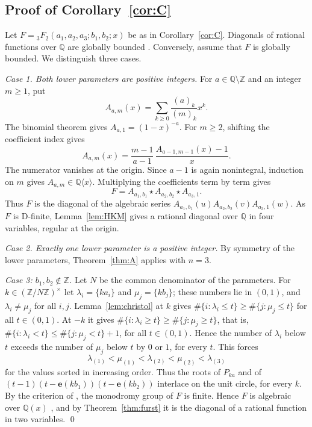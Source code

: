 \documentclass[11pt]{amsart}
\theoremstyle{definition}
\theoremstyle{remark}
\numberwithin{equation}{section}
\newcommand{\Q}{\mathbb{Q}}
\newcommand{\Z}{\mathbb{Z}}
\newcommand{\e}{\mathbf{e}}
\newcommand{\alg}[2]{#1\langle #2\rangle}
\begin{document}
\subsection{Proof of Corollary~\ref{cor:C}}\label{subsec:proofC}
Let $F={}_3F_2(a_1,a_2,a_3;b_1,b_2;x)$ be as in Corollary~\ref{cor:C}. Diagonals of rational functions over $\Q$ are globally bounded \citep{Christol1990}. Conversely, assume that $F$ is globally bounded. We distinguish three cases.

\emph{Case 1. Both lower parameters are positive integers.}
For $a\in\Q\setminus\Z$ and an integer $m\ge1$, put
\[
 A_{a,m}(x)=\sum_{k\ge0}\frac{(a)_k}{(m)_k}x^k .
\]
The binomial theorem gives $A_{a,1}=(1-x)^{-a}$. For $m\ge2$, shifting the coefficient index gives
\[
 A_{a,m}(x)=\frac{m-1}{a-1}\,\frac{A_{a-1,m-1}(x)-1}{x}.
\]
The numerator vanishes at the origin. Since $a-1$ is again nonintegral, induction on $m$ gives $A_{a,m}\in\alg{\Q}{x}$. Multiplying the coefficients term by term gives
\[
 F=A_{a_1,b_1}\star A_{a_2,b_2}\star A_{a_3,1}.
\]
Thus $F$ is the diagonal of the algebraic series $A_{a_1,b_1}(u)A_{a_2,b_2}(v)A_{a_3,1}(w)$. As $F$ is D-finite, Lemma~\ref{lem:HKM} gives a rational diagonal over $\Q$ in four variables, regular at the origin.

\emph{Case 2. Exactly one lower parameter is a positive integer.} By symmetry of the lower parameters, Theorem~\ref{thm:A} applies with $n=3$.

\emph{Case 3: $b_1,b_2\notin\Z$.} Let $N$ be the common denominator of the parameters. For $k\in(\Z/N\Z)^\times$ let $\lambda_i=\{ka_i\}$ and $\mu_j=\{kb_j\}$; these numbers lie in $(0,1)$, and $\lambda_i\ne\mu_j$ for all $i,j$. Lemma~\ref{lem:christol} at $k$ gives $\#\{i:\lambda_i\le t\}\ge\#\{j:\mu_j\le t\}$ for all $t\in(0,1)$. At $-k$ it gives $\#\{i:\lambda_i\ge t\}\ge\#\{j:\mu_j\ge t\}$, that is, $\#\{i:\lambda_i<t\}\le\#\{j:\mu_j<t\}+1$, for all $t\in(0,1)$. Hence the number of $\lambda_i$ below $t$ exceeds the number of $\mu_j$ below $t$ by $0$ or $1$, for every $t$. This forces
\[
\lambda_{(1)}<\mu_{(1)}<\lambda_{(2)}<\mu_{(2)}<\lambda_{(3)}
\]
for the values sorted in increasing order. Thus the roots of $P_{ka}$ and of $(t-1)(t-\e(kb_1))(t-\e(kb_2))$ interlace on the unit circle, for every $k$. By the criterion of \citet[Theorem~4.8]{BeukersHeckman1989}, the monodromy group of $F$ is finite. Hence $F$ is algebraic over $\Q(x)$ \citep[compare][Theorem~33]{Christol2015}, and by Theorem~\ref{thm:furst} it is the diagonal of a rational function in two variables. \qed
\end{document}
